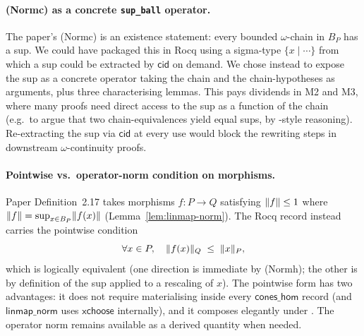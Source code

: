 \paragraph{(Normc) as a concrete \texttt{sup\_ball} operator.}
The paper's (Normc) is an existence statement: every bounded
$\omega$-chain in $B_P$ has a sup. We could have packaged this in
Rocq using a sigma-type $\{x \mid \cdots\}$ from which a sup could
be extracted by $\mathsf{cid}$ on demand. We chose instead to
expose the sup as a concrete operator
 taking the chain and the
chain-hypotheses as arguments, plus three characterising lemmas.
This pays dividends in M2 and M3, where many proofs need direct
access to the sup as a function of the chain (e.g.\ to argue that
two chain-equivalences yield equal sups, by
-style reasoning).
Re-extracting the sup via $\mathsf{cid}$ at every use would block
the rewriting steps in downstream
$\omega$-continuity proofs.

\paragraph{Pointwise vs.\ operator-norm condition on morphisms.}
Paper Definition~2.17 takes morphisms $f : P \to Q$ satisfying
$\lVert f \rVert \leq 1$ where $\lVert f \rVert = \sup_{x \in B_P} \lVert f(x) \rVert$
(Lemma~\ref{lem:linmap-norm}). The Rocq record
 instead carries the
pointwise condition
\[
  \forall x \in P, \quad \lVert f(x) \rVert_Q \;\leq\; \lVert x \rVert_P,
\]
which is logically equivalent (one direction is immediate by
(Normh); the other is by definition of the sup applied to a
rescaling of $x$). The pointwise form has two advantages: it does
not require materialising
 inside every
$\mathsf{cones\_hom}$ record (and $\mathsf{linmap\_norm}$ uses
$\mathsf{xchoose}$ internally), and it composes elegantly under
. The operator norm
remains available as a derived quantity when needed.

